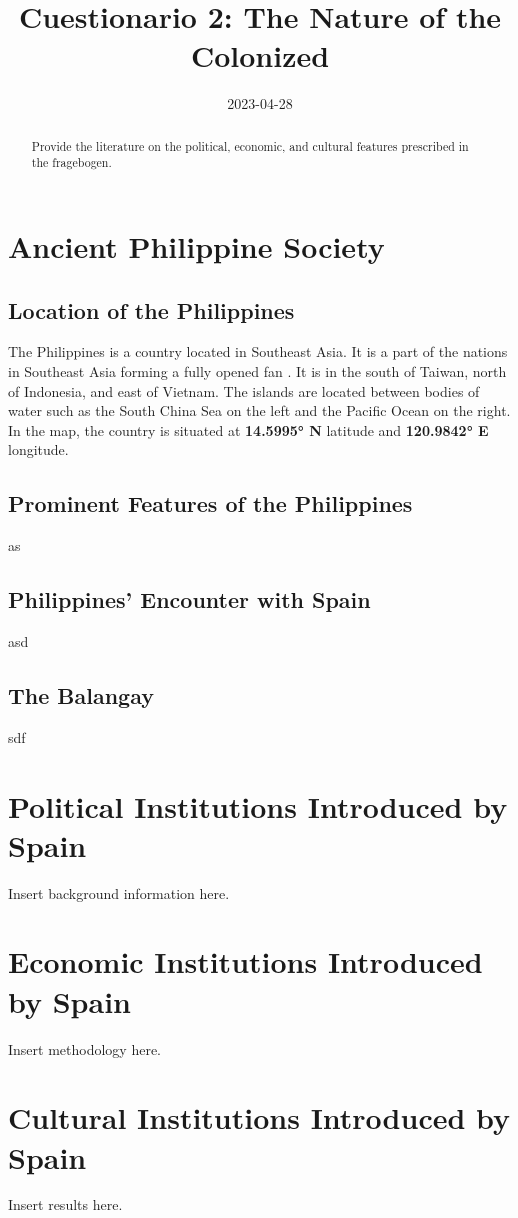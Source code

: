 \documentclass[12pt]{article}
\title{Cuestionario 2: The Nature of the Colonized}
\date{2023-04-28}
\begin{document}
\maketitle

\newpage

\tableofcontents

\newpage

\begin{abstract}
Provide the literature on the political, economic, and cultural features prescribed in the fragebogen. 
\end{abstract}





\section{Ancient Philippine Society}
  \subsection{Location of the Philippines}
  The Philippines is a country located in Southeast Asia. It is a part of the nations in Southeast Asia forming a fully opened fan \citep{corpuz1965philippines}. 
  It is in the south of Taiwan, north of Indonesia, and east of Vietnam. The islands are located between bodies of water such as the South China Sea 
  on the left and the Pacific Ocean on the right. In the map, the country is situated at \textbf{14.5995° N} latitude and \textbf{120.9842° E} longitude.
  \subsection{Prominent Features of the Philippines}
  as
  \subsection{Philippines' Encounter with Spain}
  asd
  \subsection{The Balangay}
  sdf






\section{Political Institutions Introduced by Spain}
Insert background information here.






\section{Economic Institutions Introduced by Spain}
Insert methodology here.





\section{Cultural Institutions Introduced by Spain}
Insert results here.








\end{document}
